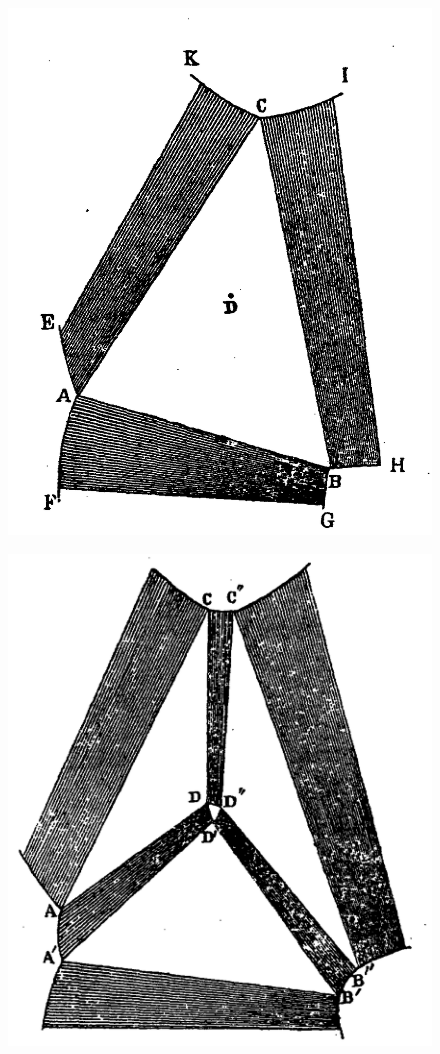 \documentclass[12pt]{memoir}
\begin{document}
\begin{figure}[h]
\centering
\begin{minipage}{.3\textwidth}
  \centering
  \includegraphics[width=\linewidth]{fig_2}
  \label{fig_2}
\end{minipage}%
\begin{minipage}{.3\textwidth}
  \centering
  \includegraphics[width=\linewidth]{fig_3}

\end{minipage}
\end{figure}
\end{document}
